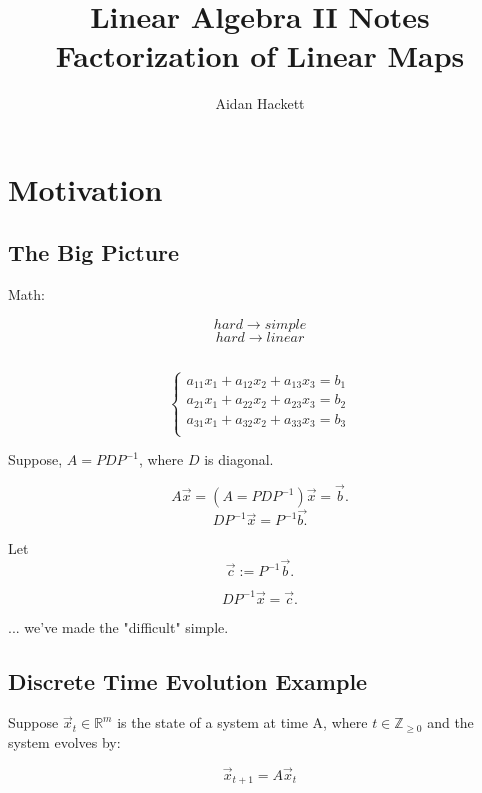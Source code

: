 \documentclass[a4paper,10pt]{article}
\begin{document}
\title{Linear Algebra II Notes \\
\Large{Factorization of Linear Maps}}
\author{Aidan Hackett}
\maketitle

\section{Motivation}

\subsection{The Big Picture}
Math:

$$hard \longrightarrow simple$$
$$hard \longrightarrow linear$$

\subsection{}
\begin{equation}
	\left\{ \begin{aligned} 
		a_{11}x_{1} + a_{12}x_{2} + a_{13}x_{3} = b_{1} \\
		a_{21}x_{1} + a_{22}x_{2} + a_{23}x_{3} = b_{2} \\
		a_{31}x_{1} + a_{32}x_{2} + a_{33}x_{3} = b_{3} \\
	\end{aligned} \right.
\end{equation}



Suppose, $A=PDP^{-1}$, where $D$ is diagonal.

$$A\vec{x}=(A=PDP^{-1})\vec{x} = \vec{b}.$$
$$DP^{-1}\vec{x} = P^{-1}\vec{b.}$$

Let $$\vec{c} := P^{-1}\vec{b}.$$

$$DP^{-1}\vec{x} = \vec{c}.$$

... we've made the "difficult" simple.

\subsection{Discrete Time Evolution Example}

Suppose $\vec{x}_t \in \mathbb{R}^m$ is the state of a system at time A, where $t\in\mathbb{Z}_{\geq 0}$ and the system evolves by:

$$ \vec{x}_{t+1} = A\vec{x}_t$$
\end{document}
